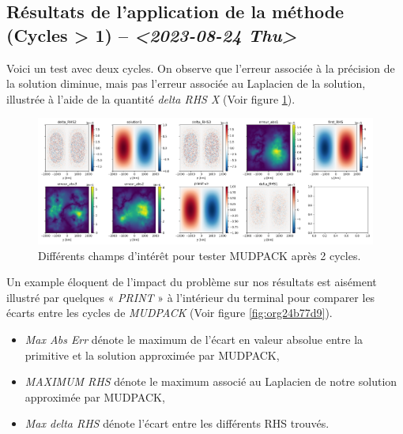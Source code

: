 \documentclass[10pt]{article}
\numberwithin{equation}{section}
\begin{document}
\subsection{Résultats de l'application de la méthode (Cycles > 1) -- \textit{<2023-08-24 Thu>}}
\label{sec:org0d95c7a}
Voici un test avec deux cycles.
On observe que l'erreur associée à la précision de la solution diminue, mais pas l'erreur associée au Laplacien de la solution, illustrée à l'aide de la quantité \emph{delta RHS X} (Voir figure \ref{fig:org42298cf}).

\begin{figure}[htbp]
\centering
\includegraphics[width=.9\linewidth]{figures/MUDPACK/2023-08-23_MUDPACK_test_dirichlet3.png}
\caption{\label{fig:org42298cf}Différents champs d'intérêt pour tester MUDPACK après 2 cycles.}
\end{figure}

Un example éloquent de l'impact du problème sur nos résultats est aisément illustré par quelques « \emph{PRINT} » à l'intérieur du terminal pour comparer les écarts entre les cycles de \emph{MUDPACK} (Voir figure \ref{fig:org24b77d9}).
\begin{itemize}
\item \emph{Max Abs Err} dénote le maximum de l'écart en valeur absolue entre la primitive et la solution approximée par MUDPACK,
\item \emph{MAXIMUM RHS} dénote le maximum associé au Laplacien de notre solution approximée par MUDPACK,
\item \emph{Max delta RHS} dénote l'écart entre les différents RHS trouvés.
\end{itemize}
\end{document}
